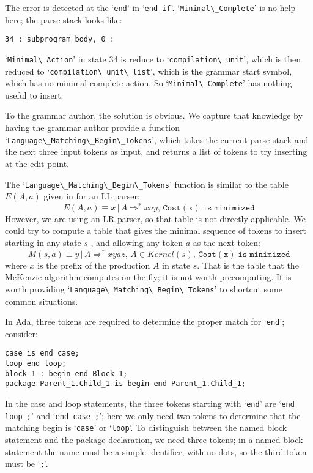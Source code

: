 \documentclass{article}
\newcommand{\code}[1]{`\lstinline|#1|'}
\begin{document}
The error is detected at the \code{end} in \code{end if}.
\code{Minimal\_Complete} is no help here; the parse stack looks like:
\begin{verbatim}
34 : subprogram_body, 0 :
\end{verbatim}
\code{Minimal\_Action} in state 34 is reduce to
\code{compilation\_unit}, which is then reduced to
\code{compilation\_unit\_list}, which is the grammar start symbol,
which has no minimal complete action. So \code{Minimal\_Complete} has
nothing useful to insert.

To the grammar author, the solution is obvious. We capture that
knowledge by having the grammar author provide a function\\
\code{Language\_Matching\_Begin\_Tokens}, which takes the current parse
stack and the next three input tokens as input, and returns a list of
tokens to try inserting at the edit point.

The \code{Language\_Matching\_Begin\_Tokens} function is similar to the
table\\ $E(A,a)$ given in \cite{FMQ 1980} for an LL parser:
\begin{equation}
E(A,a) \equiv x \, | \, A \Rightarrow^* xay, \, \mathtt{Cost(x)\; is\; minimized}
\end{equation}
However, we are using an LR parser, so that table is not directly
applicable. We could try to compute a table that gives the minimal
sequence of tokens to insert starting in any state $s$ , and
allowing any token $a$ as the next token:
\begin{equation}
M(s,a) \equiv y \, | \, A \Rightarrow^* xyaz, \, A \in Kernel(s), \, \mathtt{Cost(x)\; is\; minimized}
\end{equation}
where $x$ is the prefix of the production $A$ in state $s$.
That is the table that the McKenzie algorithm computes on the fly; it
is not worth precomputing. It is worth providing
\code{Language\_Matching\_Begin\_Tokens} to shortcut some common
situations.

In Ada, three tokens are required to determine the proper match for
\code{end}; consider:
\begin{lstlisting}
case is end case;
loop end loop;
block_1 : begin end Block_1;
package Parent_1.Child_1 is begin end Parent_1.Child_1;
\end{lstlisting}
In the case and loop statements, the three tokens starting with
\code{end} are \code{end loop ;} and \code{end case ;}; here we only
need two tokens to determine that the matching begin is \code{case} or
\code{loop}.
To distinguish between the named block statement and the package
declaration, we need three tokens; in a named block statement the name
must be a simple identifier, with no dots, so the third token must be
\code{;}.
\end{document}

